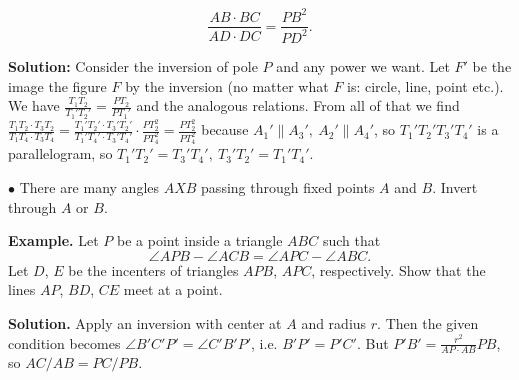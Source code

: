 \documentclass[11pt,a4paper]{article}
\begin{document}
\[ \frac{AB\cdot BC}{AD\cdot DC}=\frac{PB^2}{PD^2}. \]

\textbf {Solution:} Consider the inversion of pole $ P$ and any power we want. Let $ F'$ be the image the figure $ F$ by the inversion (no matter what $ F$ is: circle, line, point etc.). We have $ \frac {T_{1}T_{2}}{T_{1}'T_{2}'} = \frac {PT_{2}}{PT_{1}'}$ and the analogous relations. From all of that we find $ \frac {T_{1}T_{2}\cdot T_{3}T_{2}}{T_{1}T_{4}\cdot T_{3}T_{4}} = \frac {T_{1}'T_{2}'\cdot T_{3}'T_{2}'}{T_{1}'T_{4}'\cdot T_{3}'T_{4}'}\cdot \frac {PT_{2}^{2}}{PT_{4}^{2}} = \frac {PT_{2}^{2}}{PT_{4}^{2}}$ because $ A_{1}'\parallel A_{3}',\ A_{2}'\parallel A_{4}'$, so $ T_{1}'T_{2}'T_{3}'T_{4}'$ is a parallelogram, so $ T_{1}'T_{2}' = T_{3}'T_{4}',\ T_{3}'T_{2}' = T_{1}'T_{4}'$. 

$\bullet$ There are many angles $AXB$ passing through fixed points $A$ and $B$. Invert through $A$ or $B$. 

\textbf {Example.} Let $ P$ be a point inside a triangle $ ABC$ such that
\[ \angle APB - \angle ACB = \angle APC - \angle ABC. \]
Let $ D$, $ E$ be the incenters of triangles $ APB$, $ APC$, respectively. Show that the lines $ AP$, $ BD$, $ CE$ meet at a point.

\textbf {Solution.} Apply an inversion with center at $A$ and radius $r$. Then the given condition becomes $\angle B\prime C\prime P\prime = \angle C\prime B\prime P\prime$, i.e. $B'P'=P'C'$. But $P\prime B\prime =\frac{r^2}{AP\cdot AB}PB$, so $AC/AB=PC/PB$. 
\end{document}
